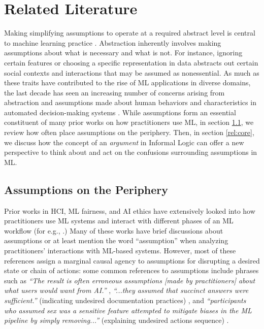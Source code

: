 \section{Related Literature}

Making simplifying assumptions to operate at a required abstract level is central to machine learning practice \cite{selbst2019fairness,saitta2013abstraction}. Abstraction inherently involves making assumptions about what is necessary and what is not. For instance, ignoring certain features or choosing a specific representation in data abstracts out certain social contexts and interactions that may be assumed as nonessential. As much as these traits have contributed to the rise of ML applications in diverse domains, the last decade has seen an increasing number of concerns arising from abstraction and assumptions made about human behaviors and characteristics in automated decision-making systems \cite{benjamin2019race,noble2018algorithms,o2017weapons,eubanks2018automating}. While assumptions form an essential constituent of many prior works on how practitioners use ML, in section \ref{rel:periphery}, we review how  often place assumptions on the periphery. Then, in section \ref{rel:core}, we discuss how the concept of an \textit{argument} in Informal Logic can offer a new perspective to think about and act on the confusions surrounding assumptions in ML.

\subsection{Assumptions on the Periphery}
\label{rel:periphery}

Prior works in HCI, ML fairness, and AI ethics have extensively looked into how practitioners use ML systems and interact with different phases of an ML workflow (for e.g., .) Many of these works have brief discussions about assumptions or at least mention the word ``assumption'' when analyzing practitioners' interactions with ML-based systems. However, most of these references assign a marginal causal agency to assumptions for disrupting a desired state or chain of actions: some common references to assumptions include phrases such as \textit{``The result is often erroneous assumptions [made by practitioners] about what users would want from AI.''} , \textit{``...they assumed that succinct answers were sufficient.''} (indicating undesired documentation practices) , and \textit{``participants who assumed sex was a sensitive feature attempted to mitigate biases in the ML pipeline by simply removing...''} (explaining undesired actions sequence) .

